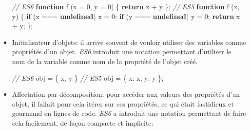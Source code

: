\documentclass[12pt,a4paper]{article}
\newenvironment{Shaded}{}{}
\newcommand{\KeywordTok}[1]{\textcolor[rgb]{0.00,0.44,0.13}{\textbf{{#1}}}}
\newcommand{\DataTypeTok}[1]{\textcolor[rgb]{0.56,0.13,0.00}{{#1}}}
\newcommand{\DecValTok}[1]{\textcolor[rgb]{0.25,0.63,0.44}{{#1}}}
\newcommand{\CommentTok}[1]{\textcolor[rgb]{0.38,0.63,0.69}{\textit{{#1}}}}
\newcommand{\ControlFlowTok}[1]{\textcolor[rgb]{0.00,0.44,0.13}{\textbf{{#1}}}}
\newcommand{\OperatorTok}[1]{\textcolor[rgb]{0.40,0.40,0.40}{{#1}}}
\newcommand{\AttributeTok}[1]{\textcolor[rgb]{0.49,0.56,0.16}{{#1}}}
\newcommand{\NormalTok}[1]{{#1}}
\begin{document}
\begin{itemize}
  \begin{Shaded}
  \begin{Highlighting}[]
  \CommentTok{// ES6}
  \KeywordTok{function} \AttributeTok{f} \NormalTok{(x }\OperatorTok{=} \DecValTok{0}\OperatorTok{,} \NormalTok{y }\OperatorTok{=} \DecValTok{0}\NormalTok{) }\OperatorTok{\{}
      \ControlFlowTok{return} \NormalTok{x }\OperatorTok{+} \NormalTok{y}
  \OperatorTok{\};}
  \CommentTok{// ES5}
  \KeywordTok{function} \AttributeTok{f} \NormalTok{(x}\OperatorTok{,} \NormalTok{y) }\OperatorTok{\{}
      \ControlFlowTok{if} \NormalTok{(x }\OperatorTok{===} \KeywordTok{undefined}\NormalTok{)}
          \NormalTok{x }\OperatorTok{=} \DecValTok{0}\OperatorTok{;}
      \ControlFlowTok{if} \NormalTok{(y }\OperatorTok{===} \KeywordTok{undefined}\NormalTok{)}
          \NormalTok{y }\OperatorTok{=} \DecValTok{0}\OperatorTok{;}
      \ControlFlowTok{return} \NormalTok{x }\OperatorTok{+} \NormalTok{y}\OperatorTok{;}
  \OperatorTok{\};}
  \end{Highlighting}
  \end{Shaded}
  \item
    Initialisateur d'objets: il arrive souvent de vouloir utiliser des
    variables comme propriétés d'un objet. \emph{ES6} introduit une
    notation permettant d'utiliser le nom de la variable comme nom de la
    propriété de l'objet créé.

  \begin{Shaded}
  \begin{Highlighting}[]
  \CommentTok{// ES6}
  \NormalTok{obj }\OperatorTok{=} \OperatorTok{\{} \NormalTok{x}\OperatorTok{,} \NormalTok{y }\OperatorTok{\}}
  \CommentTok{// ES5}
  \NormalTok{obj }\OperatorTok{=} \OperatorTok{\{} \DataTypeTok{x}\OperatorTok{:} \NormalTok{x}\OperatorTok{,} \DataTypeTok{y}\OperatorTok{:} \NormalTok{y }\OperatorTok{\};}
  \end{Highlighting}
  \end{Shaded}
  \item
    Affectation par décomposition: pour accéder aux valeurs des propriétés
    d'un objet, il fallait pour cela itérer sur ces propriétés, ce qui
    était fastidieux et gourmand en lignes de code. \emph{ES6} a introduit
    une notation permettant de faire cela facilement, de façon compacte et
    implicite:


\end{itemize}
\end{document}
